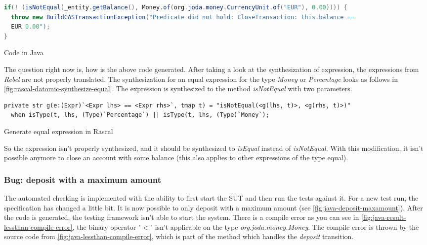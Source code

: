\begin{sourcecode}[h!]
\begin{lstlisting}[language=Java]
if(! (isNotEqual(_entity.getBalance(), Money.of(org.joda.money.CurrencyUnit.of("EUR"), 0.00)))) {
  throw new BuildCASTransactionException("Predicate did not hold: CloseTransaction: this.balance ==
  EUR 0.00");
}
\end{lstlisting}
\caption{Code in Java}\label{fig:java-notequal-check}
\end{sourcecode}

The question right now is, how is the above code generated. After taking a look at the synthesization of
expression, the expressions from \textit{Rebel} are not properly translated. The
synthesization for an equal expression for the type \textit{Money} or \textit{Percentage} looks as
follows in \autoref{fig:rascal-datomic-synthesize-equal}. The expression is
synthesized to the method \textit{isNotEqual} with two parameters.

\begin{sourcecode}[h!]
\begin{lstlisting}[]
private str g(e:(Expr)`<Expr lhs> == <Expr rhs>`, tmap t) = "isNotEqual(<g(lhs, t)>, <g(rhs, t)>)"
  when isType(t, lhs, (Type)`Percentage`) || isType(t, lhs, (Type)`Money`);
\end{lstlisting}
\caption{Generate equal expression in Rascal}\label{fig:rascal-datomic-synthesize-equal}
\end{sourcecode}

So the expression isn't properly synthesized, and it should be synthesized to
\textit{isEqual} instead of \textit{isNotEqual}. With this modification, it
isn't possible anymore to close an account with some balance (this also applies
to other expressions of the type equal).

\subsubsection{Bug: deposit with a maximum amount}\label{sec:bug-compile-max-deposit}

The automated checking is implemented with the ability to first start the
SUT and then run the tests against it. For a new test run, the
specification has changed a little bit. It is now possible to only deposit with
a maximum amount (see \autoref{fig:java-deposit-maxamount}). After the code is
generated, the testing framework isn't able to start the system. There is a
compile error as you can see in
\autoref{fig:java-result-lessthan-compile-error}, the binary operator "$<$"
isn't applicable on the type \textit{org.joda.money.Money}. The compile error
is thrown by the source code from \autoref{fig:java-lessthan-compile-error},
which is part of the method which handles the \textit{deposit} transition.

